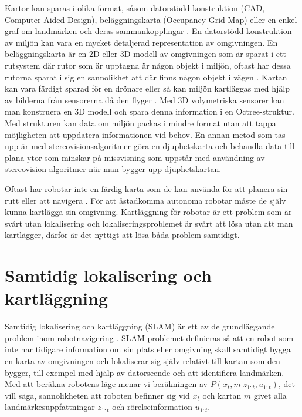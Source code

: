 Kartor kan sparas i olika format, såsom datorstödd konstruktion (CAD, Computer-Aided Design), beläggningskarta (Occupancy Grid Map) eller en enkel graf om landmärken och deras sammankopplingar \citep{982903}. En datorstödd konstruktion av miljön kan vara en mycket detaljerad representation av omgivningen. En beläggningskarta är en 2D eller 3D-modell av omgivningen som är sparat i ett rutsystem där rutor som är upptagna är någon objekt i miljön, oftast har dessa rutorna sparat i sig en sannolikhet att där finns någon objekt i vägen \citep{6095058, 982903}. Kartan kan vara färdigt sparad för en drönare eller så kan miljön kartläggas med hjälp av bilderna från sensorerna då den flyger \citep{geospatial}. Med 3D volymetriska sensorer kan man konstruera en 3D modell och spara denna information i en Octree-struktur. Med strukturen kan data om miljön packas i mindre format utan att tappa möjligheten att uppdatera informationen vid behov. En annan metod som tas upp är med stereovisionsalgoritmer göra en djuphetskarta och behandla data till plana ytor som minskar på missvisning som uppstår med användning av stereovision algoritmer när man bygger upp djuphetskartan. 

Oftast har robotar inte en färdig karta som de kan använda för att planera sin rutt eller att navigera \citep{ProbabilisticRobotics}. För att åstadkomma autonoma robotar måste de själv kunna kartlägga sin omgivning. Kartläggning för robotar är ett problem som är svårt utan lokalisering och lokaliseringsproblemet är svårt att lösa utan att man kartlägger, därför är det nyttigt att lösa båda problem samtidigt. 

\chapter{Samtidig lokalisering och kartläggning}

Samtidig lokalisering och kartläggning (SLAM) är ett av de grundläggande problem inom robotnavigering \citep{realslamproblem}. SLAM-problemet definieras så att en robot som inte har tidigare information om sin plats eller omgivning skall samtidigt bygga en karta av omgivningen och lokaliserar sig själv relativt till kartan som den bygger, till exempel med hjälp av datorseende och att identifiera landmärken. Med att beräkna robotens läge menar vi beräkningen av $P(x_t, m|z_{1:t}, u_{1:t})$, det vill säga, sannolikheten att roboten befinner sig vid $x_t$ och kartan $m$ givet alla landmärkesuppfattningar $z_{1:t}$ och rörelseinformation $u_{1:t}$. 

